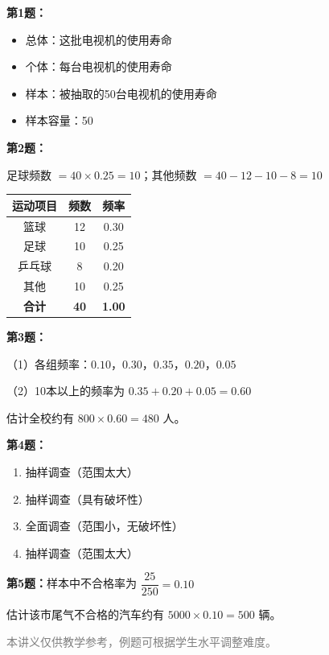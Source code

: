 \documentclass[12pt, a4paper]{ctexart}
\begin{document}
\vspace{20pt}

\begin{knowledgebox}[参考答案]
\textbf{第1题：}
\begin{itemize}[leftmargin=2em]
  \item 总体：这批电视机的使用寿命
  \item 个体：每台电视机的使用寿命
  \item 样本：被抽取的50台电视机的使用寿命
  \item 样本容量：50
\end{itemize}

\textbf{第2题：}

足球频数 $= 40 \times 0.25 = 10$；其他频数 $= 40 - 12 - 10 - 8 = 10$

\begin{center}
\begin{tabular}{|c|c|c|}
\hline
运动项目 & 频数 & 频率 \\
\hline
篮球 & 12 & 0.30 \\
\hline
足球 & 10 & 0.25 \\
\hline
乒乓球 & 8 & 0.20 \\
\hline
其他 & 10 & 0.25 \\
\hline
\textbf{合计} & \textbf{40} & \textbf{1.00} \\
\hline
\end{tabular}
\end{center}

\begin{center}
\end{center}

\textbf{第3题：}

（1）各组频率：$0.10$，$0.30$，$0.35$，$0.20$，$0.05$

（2）10本以上的频率为 $0.35 + 0.20 + 0.05 = 0.60$

估计全校约有 $800 \times 0.60 = 480$ 人。

\textbf{第4题：}
\begin{enumerate}[label=(\arabic*)]
  \item 抽样调查（范围太大）
  \item 抽样调查（具有破坏性）
  \item 全面调查（范围小，无破坏性）
  \item 抽样调查（范围太大）
\end{enumerate}

\textbf{第5题：}样本中不合格率为 $\dfrac{25}{250} = 0.10$

估计该市尾气不合格的汽车约有 $5000 \times 0.10 = 500$ 辆。
\end{knowledgebox}

\vfill
\begin{center}
\small\textcolor{gray}{本讲义仅供教学参考，例题可根据学生水平调整难度。}
\end{center}
\end{document}
